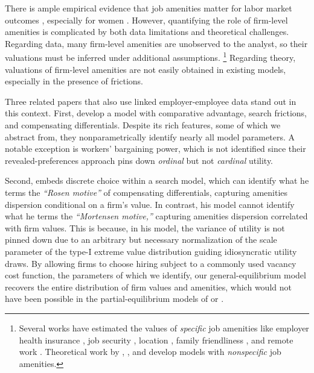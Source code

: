 There is ample empirical evidence that job amenities matter for labor market outcomes \citep{MaestasMullenPowellvonWachterWenger2023, AudolyBhullerReiremo2024, Kline2025a, Kline2025b, Mas2025}, especially for women \citep{JuhnMcCue2017, MasPallais2017, MasPallais2019, WiswallZafar2018}. However, quantifying the role of firm-level amenities is complicated by both data limitations and theoretical challenges. %
%
Regarding data, many firm-level amenities are unobserved to the analyst, so their valuations must be inferred under additional assumptions.%
%
\footnote{Several works have estimated the values of \emph{specific} job amenities like employer health insurance \citep{DeyFlinn2005}, job security \citep{Jarosch2023}, location \citep{HeisePorzio2023}, family friendliness \citep{Xiao2024}, and remote work \citep{BaggaMannSahinViolante2025}. Theoretical work by \citet{HwangMortensenReed1998}, \citet{LangMajumdar2004}, and \citet{AlbrechtCarrillo-TudelaVroman2018} develop models with \emph{nonspecific} job amenities.} %
%
Regarding theory, valuations of firm-level amenities are not easily obtained in existing models, especially in the presence of frictions.

Three related papers that also use linked employer-employee data stand out in this context. %
%
First, \citet{TaberVejlin2020} develop a model with comparative advantage, search frictions, and compensating differentials. Despite its rich features, some of which we abstract from, they nonparametrically identify nearly all model parameters. A notable exception is workers' bargaining power, which is not identified since their revealed-preferences approach pins down \emph{ordinal} but not \emph{cardinal} utility.

Second, \citet{Sorkin2018} embeds discrete choice within a search model, which can identify what he terms the \emph{``Rosen motive''} of compensating differentials, capturing amenities dispersion conditional on a firm's value. In contrast, his model cannot identify what he terms the \emph{``Mortensen motive,''} capturing amenities dispersion correlated with firm values. This is because, in his model, the variance of utility is not pinned down due to an arbitrary but necessary normalization of the scale parameter of the type-I extreme value distribution guiding idiosyncratic utility draws. By allowing firms to choose hiring subject to a commonly used vacancy cost function, the parameters of which we identify, our general-equilibrium model recovers the entire distribution of firm values and amenities, which would not have been possible in the partial-equilibrium models of \citet{TaberVejlin2020} or \citet{Sorkin2018}.

